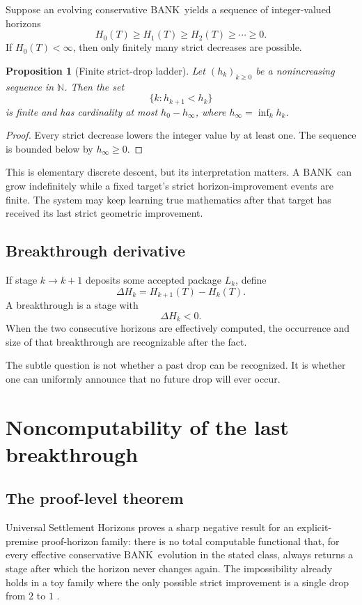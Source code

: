 \documentclass[11pt]{article}
\newtheorem{proposition}[definition]{Proposition}
\theoremstyle{remark}
\newcommand{\BANK}{\ensuremath{\mathrm{BANK}}}
\newcommand{\N}{\mathbb N}
\begin{document}
Suppose an evolving conservative \BANK\ yields a sequence of integer-valued horizons
\[
H_0(T)\ge H_1(T)\ge H_2(T)\ge\cdots\ge 0.
\]
If $H_0(T)<\infty$, then only finitely many strict decreases are possible.

\begin{proposition}[Finite strict-drop ladder]
Let $(h_k)_{k\ge0}$ be a nonincreasing sequence in $\N$. Then the set
\[
\{k:h_{k+1}<h_k\}
\]
is finite and has cardinality at most $h_0-h_\infty$, where $h_\infty=\inf_k h_k$.
\end{proposition}

\begin{proof}
Every strict decrease lowers the integer value by at least one. The sequence is bounded below by $h_\infty\ge0$.
\end{proof}

This is elementary discrete descent, but its interpretation matters. A \BANK\ can grow indefinitely while a fixed target's strict horizon-improvement events are finite. The system may keep learning true mathematics after that target has received its last strict geometric improvement.

\subsection{Breakthrough derivative}

If stage $k\to k+1$ deposits some accepted package $L_k$, define
\[
\Delta H_k=H_{k+1}(T)-H_k(T).
\]
A breakthrough is a stage with
\[
\Delta H_k<0.
\]
When the two consecutive horizons are effectively computed, the occurrence and size of that breakthrough are recognizable after the fact.

The subtle question is not whether a past drop can be recognized. It is whether one can uniformly announce that no future drop will ever occur.

\section{Noncomputability of the last breakthrough}

\subsection{The proof-level theorem}

Universal Settlement Horizons proves a sharp negative result for an explicit-premise proof-horizon family: there is no total computable functional that, for every effective conservative \BANK\ evolution in the stated class, always returns a stage after which the horizon never changes again. The impossibility already holds in a toy family where the only possible strict improvement is a single drop from $2$ to $1$ \cite{TennesonUSH}.
\end{document}
